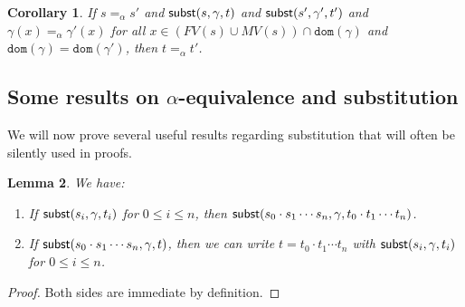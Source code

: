 \documentclass{lmcs}
\theoremstyle{theorem}\newtheorem{theorem}{Theorem}
\theoremstyle{theorem}\newtheorem{lemma}[theorem]{Lemma}
\theoremstyle{theorem}\newtheorem{corollary}[theorem]{Corollary}
\theoremstyle{definition}\newtheorem{definition}[theorem]{Definition}
\theoremstyle{definition}\newtheorem{example}[theorem]{Example}
\newcommand{\FV}{\mathit{FV}}
\newcommand{\FMV}{\mathit{MV}}
\newcommand{\domain}{\mathtt{dom}}
\begin{document}
\begin{corollary}\label{cor:substitutionalpha}
If $s =_\alpha s'$ and $\mathsf{subst}(s,\gamma,t)$ and $\mathsf{subst}(s',\gamma',t')$ and
  $\gamma(x) =_\alpha \gamma'(x)$ for all $x \in (\FV(s) \cup \FMV(s)) \cap
  \domain(\gamma)$ and $\domain(\gamma) = \domain(\gamma')$, then
  $t =_\alpha t'$.
\end{corollary}

\subsection{Some results on $\alpha$-equivalence and substitution}

We will now prove several useful results regarding substitution that will often
be silently used in proofs.

\begin{lemma}\label{lem:appsubstitute}
We have:
\begin{enumerate}
\item
  If $\mathsf{subst}(s_i,\gamma,t_i)$ for $0 \leq i \leq n$, then $\mathsf{subst}(s_0 \cdot
  s_1 \cdots s_n,\gamma,t_0 \cdot t_1 \cdots t_n)$.
\item
  If $\mathsf{subst}(s_0 \cdot s_1 \cdots s_n,\gamma,t)$, then we can write $t = t_0 \cdot t_1 \cdots t_n$
  with $\mathsf{subst}(s_i,\gamma,t_i)$ for $0 \leq i \leq n$.
\end{enumerate}
\end{lemma}

\begin{proof}
Both sides are immediate by definition.
\end{proof}
\end{document}
